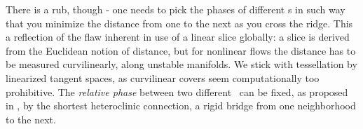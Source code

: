 There is a rub, though - one needs to pick the phases of different
{\template s} in such way that you minimize the distance from one to the
next as you cross the ridge. This a reflection of the flaw inherent in use
of a linear slice globally: a slice is derived from the Euclidean
notion of distance, but for nonlinear flows the distance has to be
measured curvilinearly, along unstable
manifolds. We stick with tessellation by
linearized tangent spaces, as curvilinear covers seem computationally too
prohibitive. The {\em relative phase} between two
different \reqva\ can be fixed, as proposed in , by the
shortest heteroclinic connection, a rigid bridge from one
neighborhood to the next.



%
